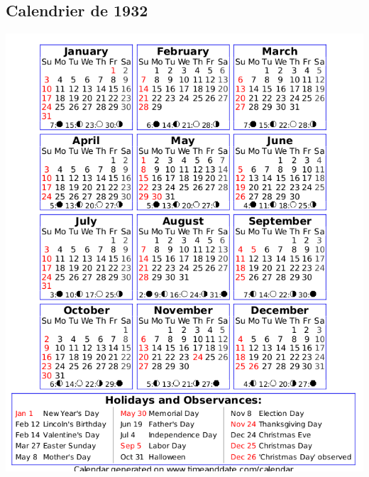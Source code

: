 \documentclass[a4paper,10pt]{article}
\begin{document}
\subsection{Calendrier de 1932}
\begin{center}
 \includegraphics[scale=0.5]{../timeline/1932.png}
\end{center}
\end{document}
